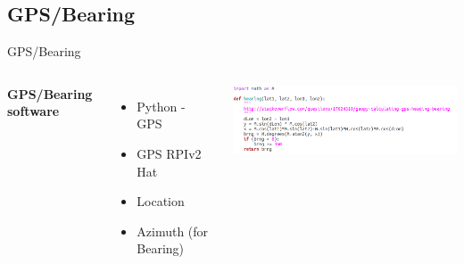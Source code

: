 \documentclass[aspectratio=169,unknownkeysallowed,xcolor=dvipsnames,beamer]{beamer} %
\begin{document}
\subsection{GPS/Bearing}
\begin{frame}[fragile]{GPS/Bearing}
\begin{columns}
\textbf{GPS/Bearing software}
\vspace{5mm}
\begin{itemize}
 \item Python - GPS 
 \item GPS RPIv2 Hat
 \item Location
 \item Azimuth (for Bearing)
 \end{itemize}
\begin{center}
 \includegraphics[width=10.5cm]{bearing_py}
\end{center}
\end{columns}
\end{frame}

{
\begin{frame}[plain]
\end{frame}}
\end{document}
